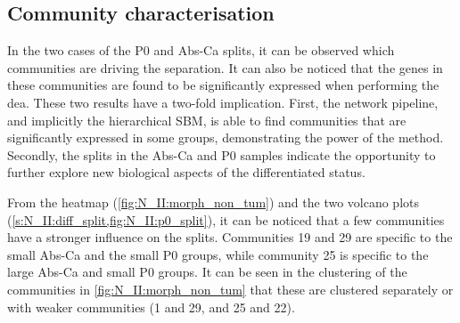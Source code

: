 \subsection{Community characterisation} \label{s:N_II:comm_charact}

In the two cases of the P0 and Abs-Ca splits, it can be observed which communities are driving the separation. It can also be noticed that the genes in these communities are found to be significantly expressed when performing the \acrlong{dea}. These two results have a two-fold implication. First, the network pipeline, and implicitly the hierarchical SBM, is able to find communities that are significantly expressed in some groups, demonstrating the power of the method. Secondly, the splits in the Abs-Ca and P0 samples indicate the opportunity to further explore new biological aspects of the differentiated status.

From the heatmap (\cref{fig:N_II:morph_non_tum}) and the two volcano plots (\cref{s:N_II:diff_split,fig:N_II:p0_split}), it can be noticed that a few communities have a stronger influence on the splits. Communities 19 and 29 are specific to the small Abs-Ca and the small P0 groups, while community 25 is specific to the large Abs-Ca and small P0 groups. It can be seen in the clustering of the communities in \cref{fig:N_II:morph_non_tum} that these are clustered separately or with weaker communities (1 and 29, and 25 and 22).




